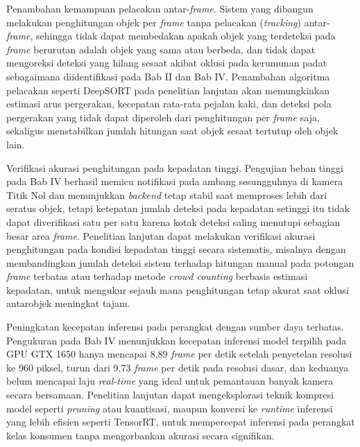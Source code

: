 Penambahan kemampuan pelacakan antar-\textit{frame}. Sistem yang dibangun melakukan 
penghitungan objek per \textit{frame} tanpa pelacakan (\textit{tracking}) antar-\textit{frame}, 
sehingga tidak dapat membedakan apakah objek yang terdeteksi pada \textit{frame} berurutan 
adalah objek yang sama atau berbeda, dan tidak dapat mengoreksi deteksi yang hilang sesaat 
akibat oklusi pada kerumunan padat sebagaimana diidentifikasi pada Bab II dan Bab IV. 
Penambahan algoritma pelacakan seperti DeepSORT pada penelitian lanjutan akan memungkinkan 
estimasi arus pergerakan, kecepatan rata-rata pejalan kaki, dan deteksi pola pergerakan 
yang tidak dapat diperoleh dari penghitungan per \textit{frame} saja, sekaligus 
menstabilkan jumlah hitungan saat objek sesaat tertutup oleh objek lain.

Verifikasi akurasi penghitungan pada kepadatan tinggi. Pengujian beban tinggi pada Bab 
IV berhasil memicu notifikasi pada ambang sesungguhnya di kamera Titik Nol dan menunjukkan 
\textit{backend} tetap stabil saat memproses lebih dari seratus objek, tetapi ketepatan 
jumlah deteksi pada kepadatan setinggi itu tidak dapat diverifikasi satu per satu karena 
kotak deteksi saling menutupi sebagian besar area \textit{frame}. Penelitian lanjutan dapat 
melakukan verifikasi akurasi penghitungan pada kondisi kepadatan tinggi secara sistematis, 
misalnya dengan membandingkan jumlah deteksi sistem terhadap hitungan manual pada potongan 
\textit{frame} terbatas atau terhadap metode \textit{crowd counting} berbasis estimasi 
kepadatan, untuk mengukur sejauh mana penghitungan tetap akurat saat oklusi antarobjek 
meningkat tajam.

Peningkatan kecepatan inferensi pada perangkat dengan sumber daya terbatas. Pengukuran 
pada Bab IV menunjukkan kecepatan inferensi model terpilih pada GPU GTX 1650 hanya 
mencapai 8,89 \textit{frame} per detik setelah penyetelan resolusi ke 960 piksel, 
turun dari 9,73 \textit{frame} per detik pada resolusi dasar, dan keduanya belum mencapai 
laju \textit{real-time} yang ideal untuk pemantauan banyak kamera secara bersamaan. 
Penelitian lanjutan dapat mengeksplorasi teknik kompresi model seperti 
\textit{pruning} atau kuantisasi, maupun konversi ke \textit{runtime} inferensi yang lebih 
efisien seperti TensorRT, untuk mempercepat inferensi pada perangkat kelas konsumen tanpa 
mengorbankan akurasi secara signifikan.

